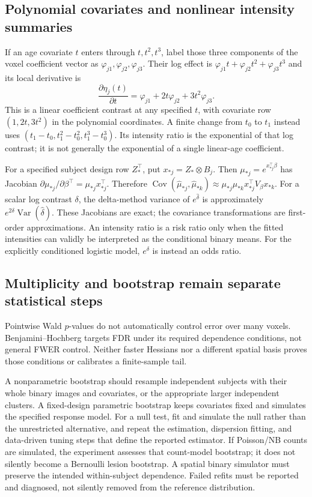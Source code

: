 \documentclass[11pt,a4paper]{article}
\newcommand{\Var}{\operatorname{Var}}
\newcommand{\Cov}{\operatorname{Cov}}
\numberwithin{equation}{section}
\begin{document}
\subsection{Polynomial covariates and nonlinear intensity summaries}
If an age covariate $t$ enters through $t,t^2,t^3$, label those
three components of the voxel coefficient vector as
$\varphi_{j1},\varphi_{j2},\varphi_{j3}$.
Their log effect is
$\varphi_{j1}t+\varphi_{j2}t^2+\varphi_{j3}t^3$ and its local derivative is
\[
 \frac{\partial\eta_j(t)}{\partial t}
 =\varphi_{j1}+2t\varphi_{j2}+3t^2\varphi_{j3}.
\]
This is a linear coefficient contrast at any specified $t$,
with covariate row $(1,2t,3t^2)$ in the polynomial coordinates.
A finite change from $t_0$ to $t_1$ instead uses
$(t_1-t_0,t_1^2-t_0^2,t_1^3-t_0^3)$.
Its intensity ratio is the exponential of that log contrast;
it is not generally the exponential of a single linear-age coefficient.

For a specified subject design row $Z_*^\top$, put
$x_{*j}=Z_*\otimes B_j$.
Then $\mu_{*j}=e^{x_{*j}^\top\beta}$ has
Jacobian $\partial\mu_{*j}/\partial\beta^\top=\mu_{*j}x_{*j}^\top$.
Therefore
$\Cov(\widehat\mu_{*j},\widehat\mu_{*k})
\approx\mu_{*j}\mu_{*k}x_{*j}^\top V_\beta x_{*k}$.
For a scalar log contrast $\delta$, the delta-method variance
of $e^{\widehat\delta}$ is approximately
$e^{2\delta}\Var(\widehat\delta)$.
These Jacobians are exact; the covariance transformations are
first-order approximations.
An intensity ratio is a risk ratio only when the fitted intensities
can validly be interpreted as the conditional binary means.
For the explicitly conditioned logistic model,
$e^\delta$ is instead an odds ratio.

\subsection{Multiplicity and bootstrap remain separate statistical steps}
Pointwise Wald $p$-values do not automatically control error over
many voxels. Benjamini--Hochberg targets FDR under its required
dependence conditions, not general FWER control.
Neither faster Hessians nor a different spatial basis proves those
conditions or calibrates a finite-sample tail.

A nonparametric bootstrap should resample independent subjects with
their whole binary images and covariates, or the appropriate larger
independent clusters. A fixed-design parametric bootstrap keeps
covariates fixed and simulates the specified response model.
For a null test, fit and simulate the null rather than the unrestricted
alternative, and repeat the estimation, dispersion fitting, and
data-driven tuning steps that define the reported estimator.
If Poisson/NB counts are simulated, the experiment assesses that
count-model bootstrap; it does not silently become a Bernoulli
lesion bootstrap. A spatial binary simulator must preserve the
intended within-subject dependence.
Failed refits must be reported and diagnosed, not silently removed
from the reference distribution.
\end{document}
